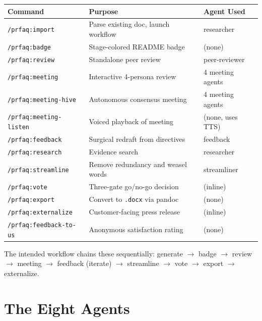 \documentclass[11pt,letterpaper]{article}
\begin{document}
\begin{table}[h]
\centering
\small
\begin{tabular}{@{}lll@{}}
\toprule
\textbf{Command} & \textbf{Purpose} & \textbf{Agent Used} \\
\midrule
\texttt{/prfaq:import}       & Parse existing doc, launch workflow  & researcher \\
\texttt{/prfaq:badge}        & Stage-colored README badge           & (none) \\
\texttt{/prfaq:review}       & Standalone peer review               & peer-reviewer \\
\texttt{/prfaq:meeting}      & Interactive 4-persona review         & 4 meeting agents \\
\texttt{/prfaq:meeting-hive} & Autonomous consensus meeting         & 4 meeting agents \\
\texttt{/prfaq:meeting-listen} & Voiced playback of meeting         & (none, uses TTS) \\
\texttt{/prfaq:feedback}     & Surgical redraft from directives     & feedback \\
\texttt{/prfaq:research}     & Evidence search                      & researcher \\
\texttt{/prfaq:streamline}   & Remove redundancy and weasel words   & streamliner \\
\texttt{/prfaq:vote}         & Three-gate go/no-go decision         & (inline) \\
\texttt{/prfaq:export}       & Convert to \texttt{.docx} via pandoc & (none) \\
\texttt{/prfaq:externalize}  & Customer-facing press release        & (inline) \\
\texttt{/prfaq:feedback-to-us} & Anonymous satisfaction rating      & (none) \\
\bottomrule
\end{tabular}
\end{table}

The intended workflow chains these sequentially: generate $\to$ badge $\to$
review $\to$ meeting $\to$ feedback (iterate) $\to$ streamline $\to$ vote $\to$
export $\to$ externalize.

\section{The Eight Agents}
\end{document}

